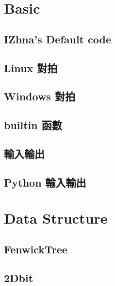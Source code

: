 \documentclass[a4paper,10pt,twocolumn,oneside]{article}
\begin{document}
\pagestyle{fancy}
\fancyfoot{}
\fancyhead[R]{\thepage}
\renewcommand{\headrulewidth}{0.4pt}
\renewcommand{\contentsname}{Contents} 

\scriptsize
\tableofcontents
\section{Basic}
\subsection{IZhna's Default code}

\subsection{Linux 對拍}

\subsection{Windows 對拍}

\subsection{builtin 函數}

\subsection{輸入輸出}

\subsection{Python 輸入輸出}


\section{Data Structure}
%
\subsection{FenwickTree}

\subsection{2Dbit}

\end{document}
